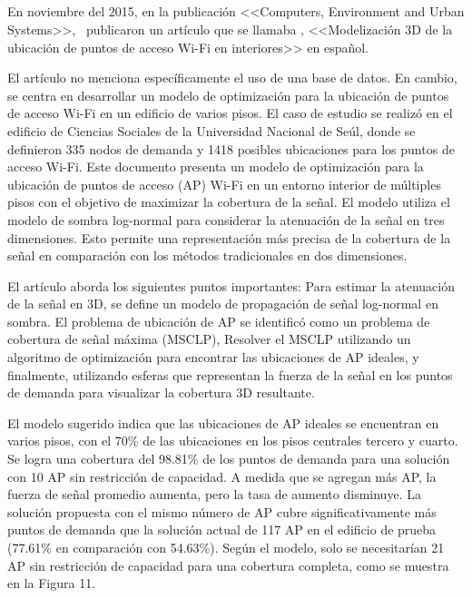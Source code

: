 \subsection{}
En noviembre del 2015, en la publicación <<Computers, Environment and Urban Systems>>, \cite{pr_lee2015coverage3d} publicaron un artículo que se llamaba , <<Modelización 3D de la ubicación de puntos de acceso Wi-Fi en interiores>> en español.

El artículo no menciona específicamente el uso de una base de datos. En cambio, se centra en desarrollar un modelo de optimización para la ubicación de puntos de acceso Wi-Fi en un edificio de varios pisos. El caso de estudio se realizó en el edificio de Ciencias Sociales de la Universidad Nacional de Seúl, donde se definieron 335 nodos de demanda y 1418 posibles ubicaciones para los puntos de acceso Wi-Fi. Este documento presenta un modelo de optimización para la ubicación de puntos de acceso (AP) Wi-Fi en un entorno interior de múltiples pisos con el objetivo de maximizar la cobertura de la señal. El modelo utiliza el modelo de sombra log-normal para considerar la atenuación de la señal en tres dimensiones. Esto permite una representación más precisa de la cobertura de la señal en comparación con los métodos tradicionales en dos dimensiones.

El artículo aborda los siguientes puntos importantes: Para estimar la atenuación de la señal en 3D, se define un modelo de propagación de señal log-normal en sombra. El problema de ubicación de AP se identificó como un problema de cobertura de señal máxima (MSCLP), Resolver el MSCLP utilizando un algoritmo de optimización para encontrar las ubicaciones de AP ideales, y finalmente, utilizando esferas que representan la fuerza de la señal en los puntos de demanda para visualizar la cobertura 3D resultante.

El modelo sugerido indica que las ubicaciones de AP ideales se encuentran en varios pisos, con el 70\% de las ubicaciones en los pisos centrales tercero y cuarto. Se logra una cobertura del 98.81\% de los puntos de demanda para una solución con 10 AP sin restricción de capacidad. A medida que se agregan más AP, la fuerza de señal promedio aumenta, pero la tasa de aumento disminuye. La solución propuesta con el mismo número de AP cubre significativamente más puntos de demanda que la solución actual de 117 AP en el edificio de prueba (77.61\% en comparación con 54.63\%). Según el modelo, solo se necesitarían 21 AP sin restricción de capacidad para una cobertura completa, como se muestra en la Figura 11.

